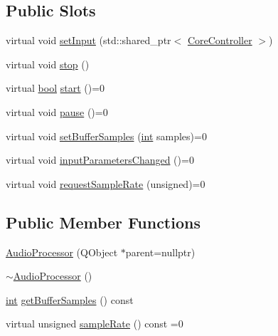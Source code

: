 \subsection*{Public Slots}
\begin{DoxyCompactItemize}
\item 
virtual void \mbox{\hyperlink{class_q_g_b_a_1_1_audio_processor_ab391c472b41b7e301b780e687c00ee8c}{set\+Input}} (std\+::shared\+\_\+ptr$<$ \mbox{\hyperlink{class_q_g_b_a_1_1_core_controller}{Core\+Controller}} $>$)
\item 
virtual void \mbox{\hyperlink{class_q_g_b_a_1_1_audio_processor_a0a4f015fcc73aedc7fd158758bb725f1}{stop}} ()
\item 
virtual \mbox{\hyperlink{libretro_8h_a4a26dcae73fb7e1528214a068aca317e}{bool}} \mbox{\hyperlink{class_q_g_b_a_1_1_audio_processor_a213f98cc7d626a4f41522d58c14792fb}{start}} ()=0
\item 
virtual void \mbox{\hyperlink{class_q_g_b_a_1_1_audio_processor_a85818cf03baf5c2ff4c3f4d4ba250100}{pause}} ()=0
\item 
virtual void \mbox{\hyperlink{class_q_g_b_a_1_1_audio_processor_a49ea31dd2330727d83651f49746517c9}{set\+Buffer\+Samples}} (\mbox{\hyperlink{ioapi_8h_a787fa3cf048117ba7123753c1e74fcd6}{int}} samples)=0
\item 
virtual void \mbox{\hyperlink{class_q_g_b_a_1_1_audio_processor_a2df53cfcd968ab9333d0f5eb9b88dba6}{input\+Parameters\+Changed}} ()=0
\item 
virtual void \mbox{\hyperlink{class_q_g_b_a_1_1_audio_processor_ad0a393ef520d75af916ab6178c38e05d}{request\+Sample\+Rate}} (unsigned)=0
\end{DoxyCompactItemize}
\subsection*{Public Member Functions}
\begin{DoxyCompactItemize}
\item 
\mbox{\hyperlink{class_q_g_b_a_1_1_audio_processor_a925e9472818e6d647bb5ae7bf8005204}{Audio\+Processor}} (Q\+Object $\ast$parent=nullptr)
\item 
\mbox{\hyperlink{class_q_g_b_a_1_1_audio_processor_a3f4e00da5cea8cd62f0325abc050a0d2}{$\sim$\+Audio\+Processor}} ()
\item 
\mbox{\hyperlink{ioapi_8h_a787fa3cf048117ba7123753c1e74fcd6}{int}} \mbox{\hyperlink{class_q_g_b_a_1_1_audio_processor_a44a16d22abaa070f9c7234b540287719}{get\+Buffer\+Samples}} () const
\item 
virtual unsigned \mbox{\hyperlink{class_q_g_b_a_1_1_audio_processor_af9fcd827f2447cca613deb3bbe50a1de}{sample\+Rate}} () const =0
\end{DoxyCompactItemize}
